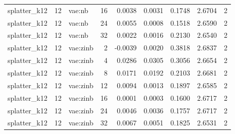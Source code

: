 \begin{tabular}{lrlrrrrrr}
splatter\_k12 & 12 & vae:nb & 16 & 0.0038 & 0.0031 & 0.1748 & 2.6704 & 2 \\
splatter\_k12 & 12 & vae:nb & 24 & 0.0055 & 0.0008 & 0.1518 & 2.6590 & 2 \\
splatter\_k12 & 12 & vae:nb & 32 & 0.0022 & 0.0016 & 0.2130 & 2.6540 & 2 \\
splatter\_k12 & 12 & vae:zinb & 2 & -0.0039 & 0.0020 & 0.3818 & 2.6837 & 2 \\
splatter\_k12 & 12 & vae:zinb & 4 & 0.0286 & 0.0305 & 0.3056 & 2.6654 & 2 \\
splatter\_k12 & 12 & vae:zinb & 8 & 0.0171 & 0.0192 & 0.2103 & 2.6681 & 2 \\
splatter\_k12 & 12 & vae:zinb & 12 & 0.0094 & 0.0013 & 0.1897 & 2.6585 & 2 \\
splatter\_k12 & 12 & vae:zinb & 16 & 0.0001 & 0.0003 & 0.1600 & 2.6717 & 2 \\
splatter\_k12 & 12 & vae:zinb & 24 & 0.0046 & 0.0036 & 0.1757 & 2.6717 & 2 \\
splatter\_k12 & 12 & vae:zinb & 32 & 0.0067 & 0.0051 & 0.1825 & 2.6531 & 2 \\
\bottomrule
\end{tabular}
